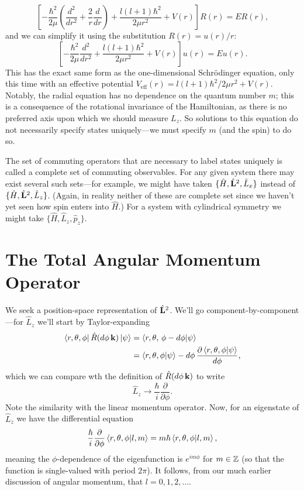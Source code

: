 \documentclass[../p116main.tex]{subfiles}
\begin{document}
\[ \left[ -\frac{\hbar^2}{2\mu} \left( \frac{d^2}{dr^2} + \frac{2}{r} \frac{d}{dr} \right) + \frac{l(l+1)\hbar^2}{2\mu r^2} + V(r) \right] R(r) = ER(r), \]
and we can simplify it using the substitution $R(r) = u(r) / r$:
\[ \left[ -\frac{\hbar^2}{2\mu} \frac{d^2}{dr^2} + \frac{l(l+1)\hbar^2}{2\mu r^2} + V(r) \right] u(r) = E u(r). \]
This has the exact same form as the one-dimensional Schrödinger equation, only this time with an effective potential $V_\textrm{eff}(r) = l(l+1)\hbar^2 / 2\mu r^2 + V(r)$.
Notably, the radial equation has no dependence on the quantum number $m$; this is a consequence of the rotational invariance of the Hamiltonian, as there is no preferred axis upon which we should measure $L_z$.
So solutions to this equation do not necessarily specify states uniquely---we must specify $m$ (and the spin) to do so.

The set of commuting operators that are necessary to label states uniquely is called a complete set of commuting observables.
For any given system there may exist several such sets---for example, we might have taken $\{ \hat H, \hat{\mathbf{L}}^2, \hat L_x \}$ instead of $\{ \hat H, \hat{\mathbf{L}}^2, \hat L_z \}$.
(Again, in reality neither of these are complete set since we haven't yet seen how spin enters into $\hat H$.)
For a system with cylindrical symmetry we might take $\{ \hat H, \hat L_z, \hat p_z \}$.

\section{The Total Angular Momentum Operator}
We seek a position-space representation of $\hat{\mathbf{L}}^2$.
We'll go component-by-component---for $\hat L_z$ we'll start by Taylor-expanding    \vspace{-10pt}
\begin{align*}
    \left< r, \theta, \phi \right| \hat R(d\phi \,\mathbf{k}) \left| \psi \right> &= \left< r, \theta, \, \phi - d\phi \middle| \psi \right> \\
    &= \left< r, \theta, \phi \middle| \psi \right> - d\phi \, \frac{\partial \left< r, \theta, \phi \middle| \psi \right>}{d\phi}, 
\end{align*}
which we can compare wth the definition of $\hat R(d\phi \,\mathbf{k})$ to write
\[ \hat L_z \longrightarrow \frac{\hbar}{i} \frac{\partial}{\partial \phi}. \]
Note the similarity with the linear momentum operator.
Now, for an eigenstate of $\hat L_z$ we have the differential equation
\[ \frac{\hbar}{i} \frac{\partial}{\partial \phi} \left< r, \theta, \phi \middle| l, m \right> = m\hbar \left< r, \theta, \phi \middle| l,m \right>, \]
meaning the $\phi$-dependence of the eigenfunction is $e^{im \phi}$ for $m \in \mathbb{Z}$ (so that the function is single-valued with period $2\pi$).
It follows, from our much earlier discussion of angular momentum, that $l = 0, 1, 2, \ldots$.
\end{document}
